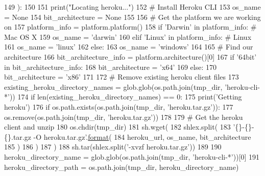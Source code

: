 \begin{DoxyCode}
149 ):
150 
151     print(\textcolor{stringliteral}{"Locating heroku..."})
152     \textcolor{comment}{# Install Heroku CLI}
153     os\_name = \textcolor{keywordtype}{None}
154     bit\_architecture = \textcolor{keywordtype}{None}
155 
156     \textcolor{comment}{# Get the platform we are working on}
157     platform\_info = platform.platform()
158     \textcolor{keywordflow}{if} \textcolor{stringliteral}{'Darwin'} \textcolor{keywordflow}{in} platform\_info:  \textcolor{comment}{# Mac OS X}
159         os\_name = \textcolor{stringliteral}{'darwin'}
160     \textcolor{keywordflow}{elif} \textcolor{stringliteral}{'Linux'} \textcolor{keywordflow}{in} platform\_info:  \textcolor{comment}{# Linux}
161         os\_name = \textcolor{stringliteral}{'linux'}
162     \textcolor{keywordflow}{else}:
163         os\_name = \textcolor{stringliteral}{'windows'}
164 
165     \textcolor{comment}{# Find our architecture}
166     bit\_architecture\_info = platform.architecture()[0]
167     \textcolor{keywordflow}{if} \textcolor{stringliteral}{'64bit'} \textcolor{keywordflow}{in} bit\_architecture\_info:
168         bit\_architecture = \textcolor{stringliteral}{'x64'}
169     \textcolor{keywordflow}{else}:
170         bit\_architecture = \textcolor{stringliteral}{'x86'}
171 
172     \textcolor{comment}{# Remove existing heroku client files}
173     existing\_heroku\_directory\_names = glob.glob(os.path.join(tmp\_dir, \textcolor{stringliteral}{'heroku-cli-*'}))
174     \textcolor{keywordflow}{if} len(existing\_heroku\_directory\_names) == 0:
175         print(\textcolor{stringliteral}{'Getting heroku'})
176         \textcolor{keywordflow}{if} os.path.exists(os.path.join(tmp\_dir, \textcolor{stringliteral}{'heroku.tar.gz'})):
177             os.remove(os.path.join(tmp\_dir, \textcolor{stringliteral}{'heroku.tar.gz'}))
178 
179         \textcolor{comment}{# Get the heroku client and unzip}
180         os.chdir(tmp\_dir)
181         sh.wget(
182             shlex.split(
183                 \textcolor{stringliteral}{'\{\}-\{\}-\{\}.tar.gz -O heroku.tar.gz'}.\hyperlink{namespaceparlai_1_1chat__service_1_1services_1_1messenger_1_1shared__utils_a32e2e2022b824fbaf80c747160b52a76}{format}(
184                     heroku\_url, os\_name, bit\_architecture
185                 )
186             )
187         )
188         sh.tar(shlex.split(\textcolor{stringliteral}{'-xvzf heroku.tar.gz'}))
189 
190     heroku\_directory\_name = glob.glob(os.path.join(tmp\_dir, \textcolor{stringliteral}{'heroku-cli-*'}))[0]
191     heroku\_directory\_path = os.path.join(tmp\_dir, heroku\_directory\_name)

\end{DoxyCode}
